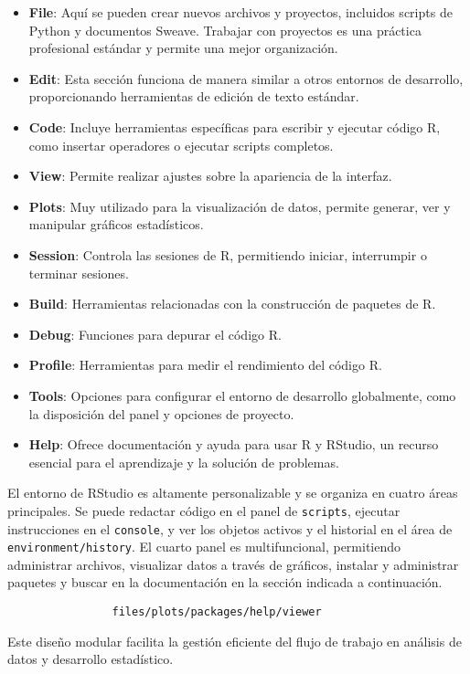 \documentclass[12pt]{report}\usepackage[]{graphicx}\usepackage[dvipsnames]{xcolor}
\begin{document}
			\begin{itemize}
				
				\item \textbf{File}: Aquí se pueden crear nuevos archivos y proyectos, incluidos scripts de Python y documentos Sweave. Trabajar con proyectos es una práctica profesional estándar y permite una mejor organización.
				
				\item \textbf{Edit}: Esta sección funciona de manera similar a otros entornos de desarrollo, proporcionando herramientas de edición de texto estándar.
				
				\item \textbf{Code}: Incluye herramientas específicas para escribir y ejecutar código R, como insertar operadores o ejecutar scripts completos.
				
				\item \textbf{View}: Permite realizar ajustes sobre la apariencia de la interfaz. 
				
				\item \textbf{Plots}: Muy utilizado para la visualización de datos, permite generar, ver y manipular gráficos estadísticos.
				
				\item \textbf{Session}: Controla las sesiones de R, permitiendo iniciar, interrumpir o terminar sesiones.
				
				\item \textbf{Build}: Herramientas relacionadas con la construcción de paquetes de R.
				
				\item \textbf{Debug}: Funciones para depurar el código R.
				
				\item \textbf{Profile}: Herramientas para medir el rendimiento del código R.
				
				\item \textbf{Tools}: Opciones para configurar el entorno de desarrollo globalmente, como la disposición del panel y opciones de proyecto.
				
				\item \textbf{Help}: Ofrece documentación y ayuda para usar R y RStudio, un recurso esencial para el aprendizaje y la solución de problemas.
				
			\end{itemize}
			
			El entorno de RStudio es altamente personalizable y se organiza en cuatro áreas principales. Se puede redactar código en el panel de \texttt{scripts}, ejecutar instrucciones en el \texttt{console}, y ver los objetos activos y el historial en el área de \texttt{environment/history}. El cuarto panel es multifuncional, permitiendo administrar archivos, visualizar datos a través de gráficos, instalar y administrar paquetes y buscar en la documentación en la sección indicada a continuación. 
			\begin{verbatim}
				files/plots/packages/help/viewer
			\end{verbatim}
			Este diseño modular facilita la gestión eficiente del flujo de trabajo en análisis de datos y desarrollo estadístico.
			
\end{document}
